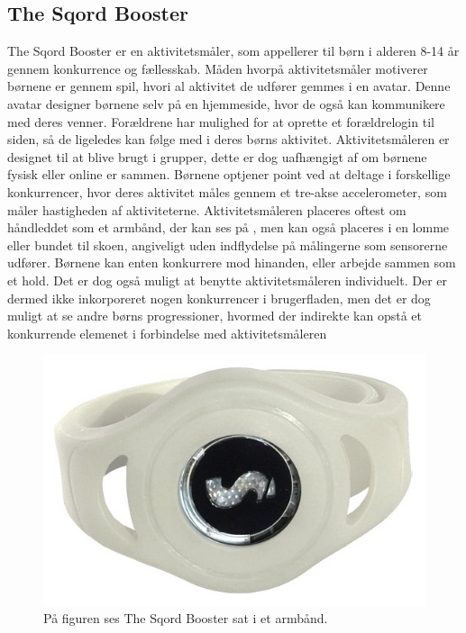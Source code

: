 \subsection{The Sqord Booster}
The Sqord Booster er en aktivitetsmåler, som appellerer til børn i alderen 8-14 år gennem konkurrence og fællesskab. Måden hvorpå aktivitetsmåler motiverer børnene er gennem spil, hvori al aktivitet de udfører gemmes i en avatar. Denne avatar designer børnene selv på en hjemmeside, hvor de også kan kommunikere med deres venner. Forældrene har mulighed for at oprette et forældrelogin til siden, så de ligeledes kan følge med i deres børns aktivitet. Aktivitetsmåleren er designet til at blive brugt i grupper, dette er dog uafhængigt af om børnene fysisk eller online er sammen. \citep{Sqord_family2015} \newline
Børnene optjener point ved at deltage i forskellige konkurrencer, hvor deres aktivitet måles gennem et tre-akse accelerometer, som måler hastigheden af aktiviteterne. Aktivitetsmåleren placeres oftest om håndleddet som et armbånd, der kan ses på , men kan også placeres i en lomme eller bundet til skoen, angiveligt uden indflydelse på målingerne som sensorerne udfører. \citep{Sqord_family2015} \newline Børnene kan enten konkurrere mod hinanden, eller arbejde sammen som et hold. Det er dog også muligt at benytte aktivitetsmåleren individuelt. Der er dermed ikke inkorporeret nogen konkurrencer i brugerfladen, men det er dog muligt at se andre børns progressioner, hvormed der indirekte kan opstå et konkurrende elemenet i forbindelse med aktivitetsmåleren\citep{Sqord_family2015,Sqord_group2015}
\begin{figure}[H]
	\centering
	\includegraphics[scale=0.35]{figures/aProblemanalyse/sqord.JPG}
	\caption{På figuren ses The Sqord Booster sat i et armbånd. \citep{Sqord2016}}
	\label{fig:sqord}
\end{figure}
